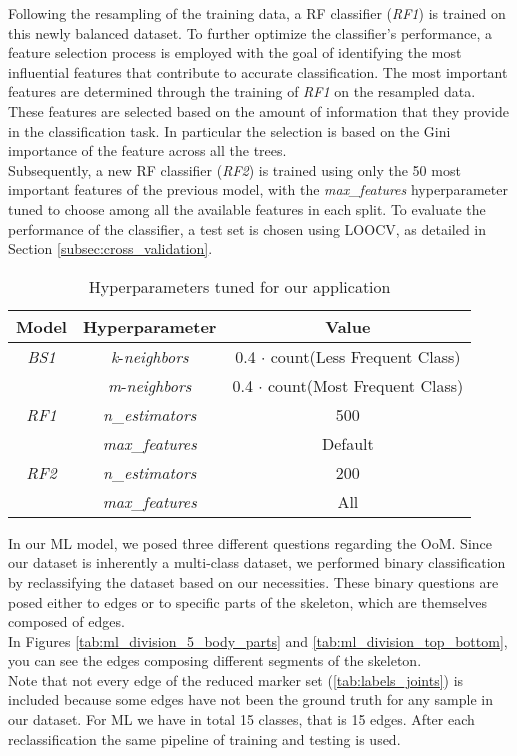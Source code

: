 Following the resampling of the training data, a RF classifier (\textit{RF1}) is trained on this newly balanced dataset.
To further optimize the classifier's performance, a feature selection process is employed with the goal of identifying the most influential features that contribute to accurate classification.
The most important features are determined through the training of \textit{RF1} on the resampled data. 
These features are selected based on the amount of information that they provide in the classification task.
In particular the selection is based on the Gini importance of the feature across all the trees. \\
Subsequently, a new RF classifier (\textit{RF2}) is trained using only the 50 most important features of the previous model, with the \textit{max\_features} hyperparameter tuned to choose among all the available features in each split.
To evaluate the performance of the classifier, a test set is chosen using LOOCV, as detailed in Section \ref{subsec:cross_validation}. 

\begin{table}[H]
    \centering
    \begin{tabular}{||c||c||c||}
        \hline
        \textbf{Model} & \textbf{Hyperparameter} & \textbf{Value} \\
        \hline
        \textit{BS1} & \textit{k}-\textit{neighbors} & 0.4 $\cdot$ count(Less Frequent Class)  \\
        & \textit{m}-\textit{neighbors} & 0.4 $\cdot$ count(Most Frequent Class)  \\
        \hline
        \textit{RF1} & \textit{n}\_\textit{estimators} & 500  \\
        & \textit{max}\_\textit{features} & Default  \\
        \hline
        \textit{RF2} & \textit{n}\_\textit{estimators} & 200  \\
        & \textit{max}\_\textit{features} & All  \\
        \hline
    \end{tabular}
    \caption{Hyperparameters tuned for our application}
    \label{tab:ml_param}
\end{table}

In our ML model, we posed three different questions regarding the OoM. 
Since our dataset is inherently a multi-class dataset, we performed binary classification by reclassifying the dataset based on our necessities.
These binary questions are posed either to edges or to specific parts of the skeleton, which are themselves composed of edges. \\
In Figures \ref{tab:ml_division_5_body_parts} and \ref{tab:ml_division_top_bottom}, you can see the edges composing different segments of the skeleton. \\
Note that not every edge of the reduced marker set (\ref{tab:labels_joints}) is included because some edges have not been the ground truth for any sample in our dataset.
For ML we have in total 15 classes, that is 15 edges.
After each reclassification the same pipeline of training and testing is used.

